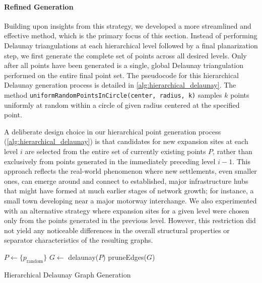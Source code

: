 \paragraph{Refined Generation}

Building upon insights from this strategy, we developed a more streamlined and effective method, which is the primary focus of this section.
Instead of performing Delaunay triangulations at each hierarchical level followed by a final planarization step, we first generate the complete set of points across all desired levels.
Only after all points have been generated is a single, global Delaunay triangulation performed on the entire final point set.
The pseudocode for this hierarchical Delaunay generation process is detailed in \cref{alg:hierarchical_delaunay}.
The method \texttt{uniformRandomPointsInCircle(center, radius, k)} samples \(k\) points uniformly at random within a circle of given radius centered at the specified point.

A deliberate design choice in our hierarchical point generation process (\cref{alg:hierarchical_delaunay}) is that candidates for new expansion sites at each level \(i\) are selected from the entire set of currently existing points \(P\), rather than exclusively from points generated in the immediately preceding level \(i-1\).
This approach reflects the real-world phenomenon where new settlements, even smaller ones, can emerge around and connect to established, major infrastructure hubs that might have formed at much earlier stages of network growth; for instance, a small town developing near a major motorway interchange.
We also experimented with an alternative strategy where expansion sites for a given level were chosen only from the points generated in the previous level.
However, this restriction did not yield any noticeable differences in the overall structural properties or separator characteristics of the resulting graphs.

\begin{algorithm}[tbhp]
	\BlankLine
	\(P \longleftarrow \{p_\text{random}\}\)\;
	\BlankLine
	\BlankLine
	\(G \longleftarrow\) delaunay(\(P\))\;
	pruneEdges(\(G\))\;
	\;
	\caption{Hierarchical Delaunay Graph Generation}
	\label{alg:hierarchical_delaunay}
\end{algorithm}

